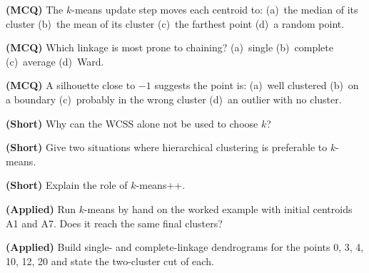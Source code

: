 \begin{reviewq}
  \item \textbf{(MCQ)} The $k$-means update step moves each centroid to:
        (a)~the median of its cluster (b)~the mean of its cluster (c)~the farthest
        point (d)~a random point.
  \item \textbf{(MCQ)} Which linkage is most prone to chaining? (a)~single
        (b)~complete (c)~average (d)~Ward.
  \item \textbf{(MCQ)} A silhouette close to $-1$ suggests the point is:
        (a)~well clustered (b)~on a boundary (c)~probably in the wrong cluster
        (d)~an outlier with no cluster.
  \item \textbf{(Short)} Why can the WCSS alone not be used to choose $k$?
  \item \textbf{(Short)} Give two situations where hierarchical clustering is
        preferable to $k$-means.
  \item \textbf{(Short)} Explain the role of $k$-means++.
  \item \textbf{(Applied)} Run $k$-means by hand on the worked example with initial
        centroids A1 and A7. Does it reach the same final clusters?
  \item \textbf{(Applied)} Build single- and complete-linkage dendrograms for the
        points 0, 3, 4, 10, 12, 20 and state the two-cluster cut of each.
\end{reviewq}

